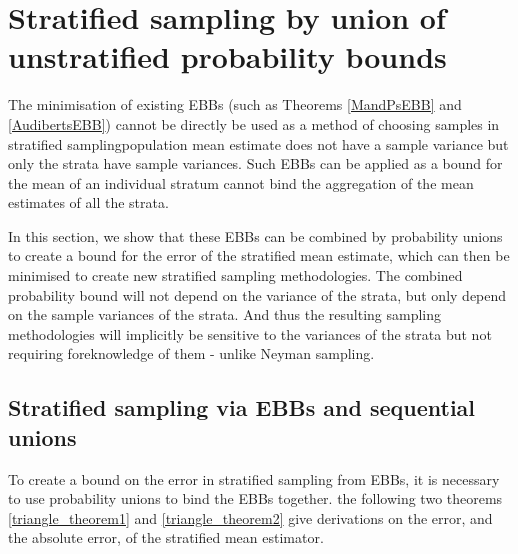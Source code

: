 
\section{Stratified sampling by union of unstratified probability bounds}\label{section:old_statistics}

The minimisation of existing EBBs (such as Theorems \ref{MandPsEBB} and \ref{AudibertsEBB}) cannot be directly be used as a method of choosing samples in stratified sampling\DIFdelbegin {}\DIFdelend \DIFaddbegin {}\DIFaddend population mean estimate does not \DIFdelbegin {}\DIFdelend have a sample variance \DIFdelbegin \DIFdel{, }\DIFdelend but only the strata have \DIFdelbegin {}\DIFdelend sample variances. Such EBBs can be applied as a bound for the mean of an individual stratum \DIFdelbegin {}\DIFdelend \DIFaddbegin {}\DIFaddend cannot bind the aggregation of the mean estimates of all the strata.
\DIFdelbegin %

\DIFdelend In this section, we show that these EBBs can be combined by probability unions to create a bound for the error of the stratified mean estimate, which can then be minimised to create new stratified sampling methodologies.
The combined probability bound will not depend on the variance of the strata, but only depend on the sample variances of the strata.
And thus the resulting sampling methodologies will implicitly be sensitive to the variances of the strata but not requiring foreknowledge of them - unlike Neyman sampling.

\subsection{Stratified sampling via EBBs and sequential unions}\label{section:unionising_ebbs}

To create a bound on the error in stratified sampling from EBBs, it is necessary to use probability unions to bind the EBBs together.
\DIFaddbegin {}\DIFaddend the following two theorems \ref{triangle_theorem1} and \ref{triangle_theorem2} \DIFaddbegin {}\DIFaddend give derivations on the error, and the absolute error, of the stratified mean estimator.

